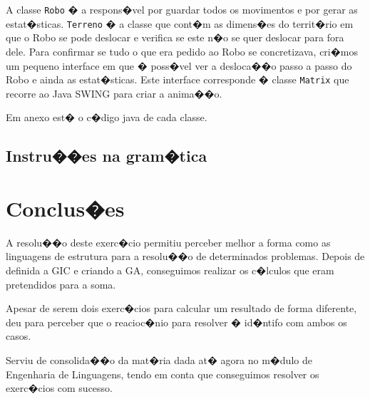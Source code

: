 \documentclass[a4paper]{article}
\begin{document}
A classe \verb|Robo| � a respons�vel por guardar todos os movimentos e por gerar as estat�sticas. \verb|Terreno| � a classe que cont�m as dimens�es do territ�rio em que o Robo se pode deslocar e verifica se este n�o se quer deslocar para fora dele. Para confirmar se tudo o que era pedido ao Robo se concretizava, cri�mos um pequeno interface em que � poss�vel ver a desloca��o passo a passo do Robo e ainda as estat�sticas. Este interface corresponde � classe \verb|Matrix| que recorre ao Java SWING para criar a anima��o.

Em anexo est� o c�digo java de cada classe.

\subsection{Instru��es na gram�tica}



\newpage

\section{Conclus�es}

A resolu��o deste exerc�cio permitiu perceber melhor a forma como as linguagens 
de estrutura para a resolu��o de determinados problemas. Depois de definida a GIC e 
criando a GA, conseguimos realizar os c�lculos que eram pretendidos para a soma.

Apesar de serem dois exerc�cios para calcular um resultado de forma diferente,
deu para perceber que o reacioc�nio para resolver � id�ntifo com ambos os casos.

Serviu de consolida��o da mat�ria dada at� agora no m�dulo de Engenharia de Linguagens,
tendo em conta que conseguimos resolver os exerc�cios com sucesso.
\end{document}
